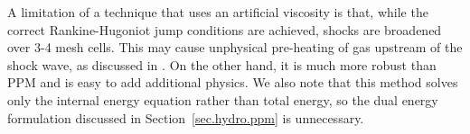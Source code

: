 A limitation of a technique that uses an artificial viscosity is that, while the correct Rankine-Hugoniot jump conditions are achieved, shocks are broadened over 3-4 mesh cells. This may cause unphysical pre-heating of gas upstream of the shock wave, as discussed in \citet{1994ApJ...429..434A}.  On the other hand, it is much more robust than PPM and is easy to add additional physics.  We also note that this method solves only the internal energy equation rather than total energy, so the dual energy formulation discussed in Section~\ref{sec.hydro.ppm} is unnecessary.
